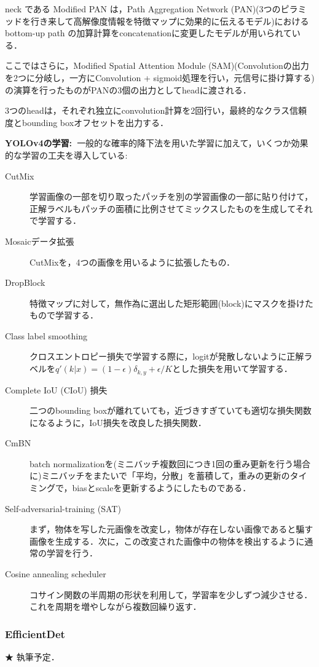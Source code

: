 \documentclass[originalpaper,fleqn]{jsaiart}     %
\begin{document}
neck である Modified PAN は，Path Aggregation Network (PAN)(3つのピラミッドを行き来して高解像度情報を特徴マップに効果的に伝えるモデル)におけるbottom-up path の加算計算をconcatenationに変更したモデルが用いられている．

ここではさらに，Modified Spatial Attention Module (SAM)(Convolutionの出力を2つに分岐し，一方にConvolution + sigmoid処理を行い，元信号に掛け算する)の演算を行ったものがPANの3個の出力としてheadに渡される．

3つのheadは，それぞれ独立にconvolution計算を2回行い，最終的なクラス信頼度とbounding boxオフセットを出力する．

{\bf YOLOv4の学習:\ }一般的な確率的降下法を用いた学習に加えて，いくつか効果的な学習の工夫を導入している: 

\begin{description}
    \item[CutMix] 学習画像の一部を切り取ったパッチを別の学習画像の一部に貼り付けて，正解ラベルもパッチの面積に比例させてミックスしたものを生成してそれで学習する．
    \item[Mosaicデータ拡張] CutMixを，4つの画像を用いるように拡張したもの．
    \item[DropBlock] 特徴マップに対して，無作為に選出した矩形範囲(block)にマスクを掛けたもので学習する．
    \item[Class label smoothing] クロスエントロピー損失で学習する際に，logitが発散しないように正解ラベルを$q'(k|x)=(1-\epsilon)\delta_{k,y}+\epsilon/K$とした損失を用いて学習する．
    \item[Complete IoU (CIoU) 損失] 二つのbounding boxが離れていても，近づきすぎていても適切な損失関数になるように，IoU損失を改良した損失関数．
    \item[CmBN] batch normalizationを(ミニバッチ複数回につき1回の重み更新を行う場合に)ミニバッチをまたいで「平均，分散」を蓄積して，重みの更新のタイミングで，biasとscaleを更新するようにしたものである．
    \item[Self-adversarial-training (SAT)] まず，物体を写した元画像を改変し，物体が存在しない画像であると騙す画像を生成する．次に，この改変された画像中の物体を検出するように通常の学習を行う．
    \item[Cosine annealing scheduler] コサイン関数の半周期の形状を利用して，学習率を少しずつ減少させる．これを周期を増やしながら複数回繰り返す．
\end{description}
\subsubsection{EfficientDet}
★ 執筆予定．
\end{document}
